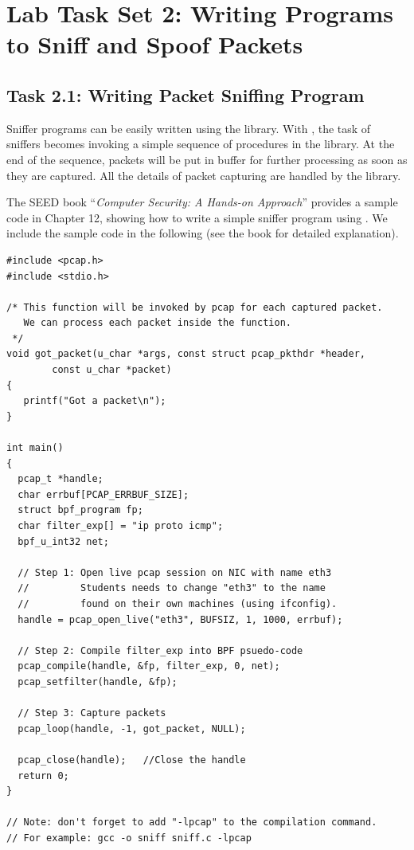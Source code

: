 \section{Lab Task Set 2: Writing Programs to Sniff and Spoof Packets}



\subsection{Task 2.1: Writing Packet Sniffing Program}

Sniffer programs can be easily written using the \pcap library. With \pcap, 
the task of 
sniffers becomes invoking a simple sequence of procedures
in the \pcap library. At the end of the sequence,
packets will be put in buffer for further processing
as soon as they are captured. All the details 
of packet capturing are handled by the \pcap library.


The SEED book ``\textit{Computer Security: A Hands-on Approach}'' provides a sample code 
in Chapter 12, showing how  to write a simple sniffer program using 
\pcap. We include the sample code in the following (see the book for detailed explanation). 

\begin{lstlisting}
#include <pcap.h>
#include <stdio.h>

/* This function will be invoked by pcap for each captured packet.
   We can process each packet inside the function.  
 */
void got_packet(u_char *args, const struct pcap_pkthdr *header,
        const u_char *packet)
{
   printf("Got a packet\n");
}

int main()
{
  pcap_t *handle;
  char errbuf[PCAP_ERRBUF_SIZE];
  struct bpf_program fp;
  char filter_exp[] = "ip proto icmp";
  bpf_u_int32 net;

  // Step 1: Open live pcap session on NIC with name eth3
  //         Students needs to change "eth3" to the name 
  //         found on their own machines (using ifconfig).
  handle = pcap_open_live("eth3", BUFSIZ, 1, 1000, errbuf); 

  // Step 2: Compile filter_exp into BPF psuedo-code
  pcap_compile(handle, &fp, filter_exp, 0, net);            
  pcap_setfilter(handle, &fp);                              

  // Step 3: Capture packets
  pcap_loop(handle, -1, got_packet, NULL);                  

  pcap_close(handle);   //Close the handle
  return 0;
}

// Note: don't forget to add "-lpcap" to the compilation command.
// For example: gcc -o sniff sniff.c -lpcap
\end{lstlisting}



